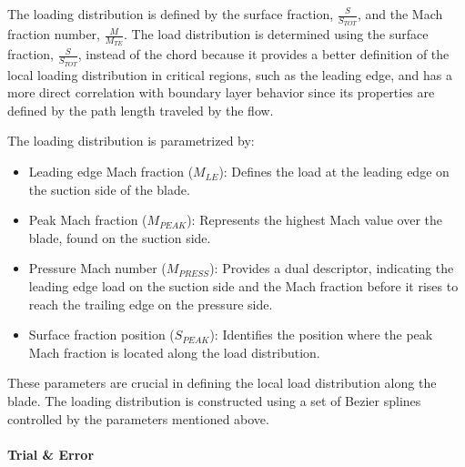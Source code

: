 \documentclass[11pt,a4paper,twocolumn]{article}
\begin{document}

The loading distribution is defined by the surface fraction, $\frac{S}{S_{TOT}}$, and the Mach fraction number, $\frac{M}{M_{TE}}$.
The load distribution is determined using the surface fraction, $\frac{S}{S_{TOT}}$, instead of the chord because it provides a better definition of the local loading distribution in critical regions, such as the leading edge, and has a more direct correlation with boundary layer behavior since its properties are defined by the path length traveled by the flow.

The loading distribution is parametrized by:

\begin{itemize}
    \item Leading edge Mach fraction ($M_{LE}$): Defines the load at the leading edge on the suction side of the blade.
    \item Peak Mach fraction ($M_{PEAK}$): Represents the highest Mach value over the blade, found on the suction side.
    \item Pressure Mach number ($M_{PRESS}$): Provides a dual descriptor, indicating the leading edge load on the suction side and the Mach fraction before it rises to reach the trailing edge on the pressure side.
    \item Surface fraction position ($S_{PEAK}$): Identifies the position where the peak Mach fraction is located along the load distribution.
\end{itemize}

These parameters are crucial in defining the local load distribution along the blade. The loading distribution is constructed using a set of Bezier splines controlled by the parameters mentioned above.

\paragraph{Trial \& Error}

\end{document}
